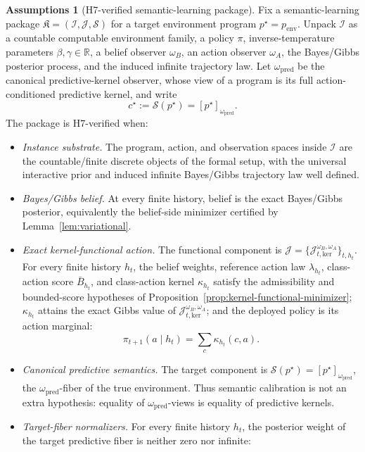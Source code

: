 \documentclass[11pt]{article}
\theoremstyle{definition}
\newtheorem{assumptions}[theorem]{Assumptions}
\theoremstyle{remark}
\newcommand{\Scal}{\mathcal{S}}
\begin{document}
\begin{assumptions}[H7-verified semantic-learning package]
\label{ass:main-verified-package}
Fix a semantic-learning package $\mathfrak K=(\mathcal I,\mathcal J,\Scal)$ for a target environment program $p^\star=p_{\mathrm{env}}$. Unpack $\mathcal I$ as a countable computable environment family, a policy $\pi$, inverse-temperature parameters $\beta,\gamma\in\mathbb R$, a belief observer $\omega_B$, an action observer $\omega_A$, the Bayes/Gibbs posterior process, and the induced infinite trajectory law. Let $\omega_{\mathrm{pred}}$ be the canonical predictive-kernel observer, whose view of a program is its full action-conditioned predictive kernel, and write
\[
c^\star:=\Scal(p^\star)=[p^\star]_{\omega_{\mathrm{pred}}}.
\]
The package is H7-verified when:
\begin{itemize}
\item[(M1)] \emph{Instance substrate.} The program, action, and observation spaces inside $\mathcal I$ are the countable/finite discrete objects of the formal setup, with the universal interactive prior and induced infinite Bayes/Gibbs trajectory law well defined.
\item[(M2)] \emph{Bayes/Gibbs belief.} At every finite history, belief is the exact Bayes/Gibbs posterior, equivalently the belief-side minimizer certified by Lemma~\ref{lem:variational}.
\item[(M3)] \emph{Exact kernel-functional action.} The functional component is $\mathcal J=\{\mathcal J_{t,\mathrm{ker}}^{\omega_B,\omega_A}\}_{t,h_t}$. For every finite history $h_t$, the belief weights, reference action law $\lambda_{h_t}$, class-action score $\bar B_{h_t}$, and class-action kernel $\kappa_{h_t}$ satisfy the admissibility and bounded-score hypotheses of Proposition~\ref{prop:kernel-functional-minimizer}; $\kappa_{h_t}$ attains the exact Gibbs value of $\mathcal J_{t,\mathrm{ker}}^{\omega_B,\omega_A}$; and the deployed policy is its action marginal:
\[
\pi_{t+1}(a\mid h_t)=\sum_c \kappa_{h_t}(c,a).
\]
\item[(M4)] \emph{Canonical predictive semantics.} The target component is $\Scal(p^\star)=[p^\star]_{\omega_{\mathrm{pred}}}$, the $\omega_{\mathrm{pred}}$-fiber of the true environment. Thus semantic calibration is not an extra hypothesis: equality of $\omega_{\mathrm{pred}}$-views is equality of predictive kernels.
\item[(M5)] \emph{Target-fiber normalizers.} For every finite history $h_t$, the posterior weight of the target predictive fiber is neither zero nor infinite:

\end{itemize}
\end{assumptions}
\end{document}
